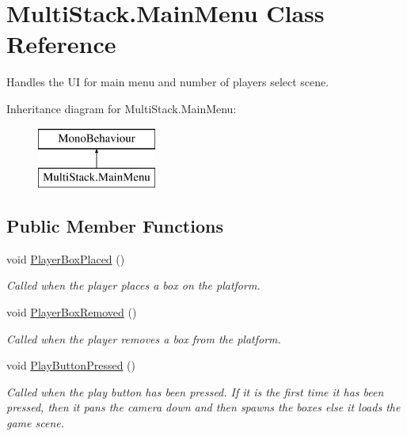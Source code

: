 \hypertarget{class_multi_stack_1_1_main_menu}{}\section{Multi\+Stack.\+Main\+Menu Class Reference}
\label{class_multi_stack_1_1_main_menu}


Handles the U\+I for main menu and number of players select scene.  


Inheritance diagram for Multi\+Stack.\+Main\+Menu\+:\begin{figure}[H]
\begin{center}
\leavevmode
\includegraphics[height=2.000000cm]{class_multi_stack_1_1_main_menu}
\end{center}
\end{figure}
\subsection*{Public Member Functions}
\begin{DoxyCompactItemize}
\item 
void \hyperlink{class_multi_stack_1_1_main_menu_ae2fe990ea5367c5613591dbd23ecf9d8}{Player\+Box\+Placed} ()
\begin{DoxyCompactList}\small\item\em Called when the player places a box on the platform. \end{DoxyCompactList}\item 
void \hyperlink{class_multi_stack_1_1_main_menu_a1e974e00f83bacb1d410a9ea6ec73e32}{Player\+Box\+Removed} ()
\begin{DoxyCompactList}\small\item\em Called when the player removes a box from the platform. \end{DoxyCompactList}\item 
void \hyperlink{class_multi_stack_1_1_main_menu_a48eb0a0757e1a7b85cb34e334da484fa}{Play\+Button\+Pressed} ()
\begin{DoxyCompactList}\small\item\em Called when the play button has been pressed. If it is the first time it has been pressed, then it pans the camera down and then spawns the boxes else it loads the game scene. \end{DoxyCompactList}\end{DoxyCompactItemize}
